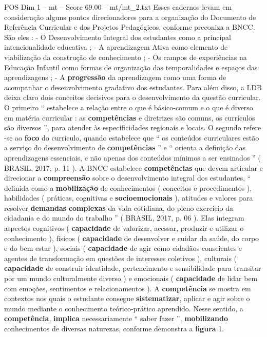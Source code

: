 \begin{textsample}{POS Dim 1 – mt – Score 69.00 – mt/mt\_2.txt}
Esses cadernos levam em consideração alguns pontos direcionadores para a organização do Documento de Referência Curricular e dos Projetos Pedagógicos, conforme preconiza a BNCC.
São eles : - O Desenvolvimento Integral dos estudantes como a principal intencionalidade educativa ; - A aprendizagem Ativa como elemento de viabilização da construção de conhecimento ; - Os campos de experiências na Educação Infantil como formas de organização das temporalidades e espaços das aprendizagens ; - A \textbf{progressão} da aprendizagem como uma forma de acompanhar o desenvolvimento gradativo dos estudantes.
Para além disso, a LDB deixa claro dois conceitos decisivos para o desenvolvimento da questão curricular.
O primeiro “ estabelece a relação entre o que é básico-comum e o que é diverso em matéria curricular : as \textbf{competências} e diretrizes são comuns, os currículos são diversos ”, para atender às especificidades regionais e locais.
O segundo refere -se ao \textbf{foco} do currículo, quando estabelece que “ os conteúdos curriculares estão a serviço do desenvolvimento de \textbf{competências} ” e “ orienta a definição das aprendizagens essenciais, e não apenas dos conteúdos mínimos a ser ensinados ” ( BRASIL, 2017, p. 11 ).
A BNCC estabelece \textbf{competências} que devem articular e direcionar a \textbf{compreensão} sobre o desenvolvimento integral dos estudantes, “ definida como a \textbf{mobilização} de conhecimentos ( conceitos e procedimentos ), habilidades ( práticas, cognitivas e \textbf{socioemocionais} ), atitudes e valores para resolver \textbf{demandas} \textbf{complexas} da vida cotidiana, do pleno exercício da cidadania e do mundo do trabalho ” ( BRASIL, 2017, p. 06 ).
Elas integram aspectos cognitivos ( \textbf{capacidade} de valorizar, acessar, produzir e utilizar o conhecimento ), físicos ( \textbf{capacidade} de desenvolver e cuidar da saúde, do corpo e do bem estar ), sociais ( \textbf{capacidade} de agir como cidadãos conscientes e agentes de transformação em questões de interesses coletivos ), culturais ( \textbf{capacidade} de construir identidade, pertencimento e sensibilidade para transitar por um mundo culturalmente diverso ) e emocionais ( \textbf{capacidade} de lidar bem com emoções, sentimentos e relacionamentos ).
A \textbf{competência} se mostra em contextos nos quais o estudante consegue \textbf{sistematizar}, aplicar e agir sobre o mundo mediante o conhecimento teórico-prático aprendido.
Nesse sentido, a \textbf{competência}, \textbf{implica} necessariamente “ saber fazer ”, \textbf{mobilizando} conhecimentos de diversas naturezas, conforme demonstra a \textbf{figura} 1.

\end{textsample}
